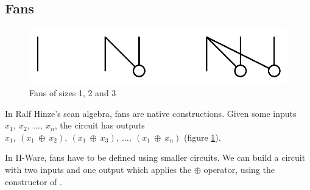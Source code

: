 \subsection{Fans}\label{fans}

\begin{figure}[ht]
\centering
\includegraphics[scale=0.25]{fans_123.pdf}
\caption{Fans of sizes 1, 2 and 3}
\label{fig:fans}
\end{figure}

In Ralf Hinze's scan algebra, fans are native constructions.
Given some inputs $x_1,\ x_2,\ \ldots{},\ x_n$, the circuit 
 has outputs $x_1,\ (x_1\ \oplus\ x_2),\ (x_1\ \oplus\ x_3),\
\ldots{},\ (x_1\ \oplus\ x_n)$ (figure \ref{fig:fans}).

In Π-Ware, fans have to be defined using smaller circuits.
We can build a  circuit with two inputs and one output which
applies the $\oplus$ operator, using the \AI{Gate} constructor of .

